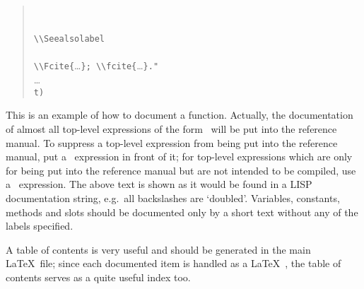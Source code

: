\begin{quote}
\begin{tabbing}
\>\\
\\
\verb|\\Seealsolabel|\\[\smallskipamount]
\>\\[\smallskipamount]
\>\verb|\\Fcite{|\ldots\verb|}; \\fcite{|\ldots\verb|}."|\\
\poptabs\>\ldots\\
\>\verb|t)|
\end{tabbing}\end{quote}
%
This is an example of how to document a function. Actually, the
documentation of almost all top-level expressions of the form
\ will be put into the reference manual.
To suppress a top-level expression from being put into the reference
manual, put a \ expression in front of it; for
top-level expressions which are only for being put into the reference
manual but are not intended to be compiled, use a \
expression. The above text is shown as it would be found in a LISP
documentation string, e.g.\ all backslashes are `doubled'. Variables,
constants, methods and slots should be documented only by a short text
without any of the labels specified.
%
\par{}A table of contents is very useful and should be generated in
the main \LaTeX\ file; since each documented item is handled as a
\LaTeX\ \lisp{section}, the table of contents serves as a quite useful
index too.
%
